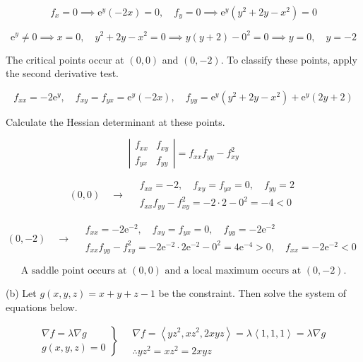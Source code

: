 \documentclass{article}
\begin{document}
\[f_x=0\implies \mathrm{e}^y(-2x) = 0,\quad f_y=0\implies\mathrm{e}^y\left(y^2+2y-x^2\right)=0\]

\[\mathrm{e}^y\neq0\implies x=0,\quad y^2+2y-x^2=0\implies y(y+2)-0^2=0\implies y=0,\quad y=-2\]

\hfill

\noindent The critical points occur at $(0,0)$ and $(0,-2)$. To classify these points, apply the second derivative test.

\[f_{xx}=-2\mathrm{e}^y,\quad f_{xy}=f_{yx}=\mathrm{e}^y(-2x),\quad f_{yy}=\mathrm{e}^y(y^2+2y-x^2)+\mathrm{e}^y\left(2y+2\right)\]

\hfill

\noindent Calculate the Hessian determinant at these points.

\[\left|\begin{array}{cc}
f_{xx}&f_{xy}\\
f_{yx}&f_{yy}
\end{array}\right|=f_{xx}f_{yy}-f_{xy}^2\]

\hfill

\[(0,0)\quad\rightarrow\quad\begin{array}{l}f_{xx}=-2,\quad f_{xy}=f_{yx}=0,\quad f_{yy}=2\\[1em]
f_{xx}f_{yy}-f_{xy}^2=-2\cdot 2-0^2=-4<0\end{array}\]

\[(0,-2)\quad\rightarrow\quad\begin{array}{l}f_{xx}=-2\mathrm{e}^{-2},\quad f_{xy}=f_{yx}=0,\quad f_{yy}=-2\mathrm{e}^{-2}\\[1em]f_{xx}f_{yy}-f_{xy}^2=-2\mathrm{e}^{-2}\cdot2\mathrm{e}^{-2}-0^2=4\mathrm{e}^{-4}>0,\quad f_{xx}=-2\mathrm{e}^{-2}<0\end{array}\]

\hfill

\[\boxed{\text{A saddle point occurs at } (0,0)\text{ and a local maximum occurs at } (0,-2).}\]

\hfill

\noindent (b) Let $g(x,y,z)=x+y+z-1$ be the constraint. Then solve the system of equations below.

\[
\left.
\begin{array}{ll}
\displaystyle\nabla f =\lambda \nabla g \\
\displaystyle g(x,y,z) = 0
\end{array}
\right\}\quad
\begin{array}{ll}
\nabla f = \left\langle yz^2,xz^2,2xyz\right\rangle=\lambda\left\langle1,1,1\right\rangle = \lambda\nabla g\\\therefore yz^2=xz^2=2xyz
\end{array}
\]
\end{document}
